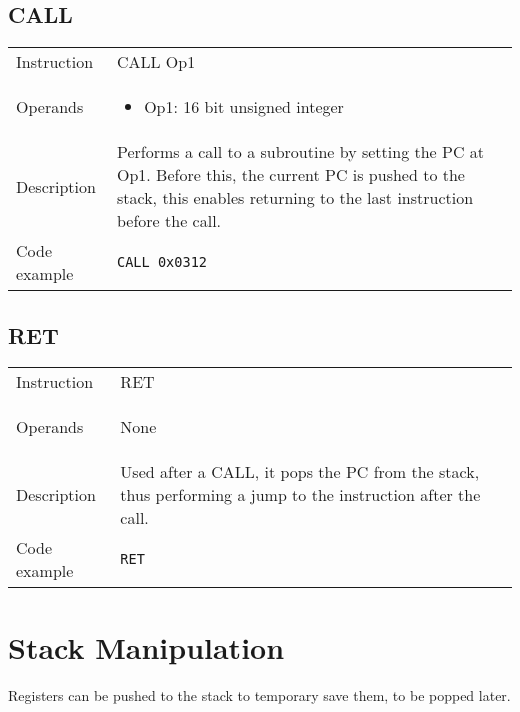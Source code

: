 \subsection{CALL}
\renewcommand*{\arraystretch}{2.0}
\begin{longtable}{P{3cm}P{9cm}}
\midrule
\noindent Instruction & CALL Op1 \\
\noindent Operands &
\begin{itemize}[label={},noitemsep,leftmargin=*,topsep=0pt,partopsep=0pt, itemsep=1em]
\item Op1: 16 bit unsigned integer
\end{itemize}\\
\noindent Description & Performs a call to a subroutine by setting the PC at Op1. Before this, the current PC is pushed to the stack, this enables returning to the last instruction before the call. \\
\noindent Code example & 
\begin{lstlisting}
CALL 0x0312
\end{lstlisting} \\
\end{longtable}


\subsection{RET}
\renewcommand*{\arraystretch}{2.0}
\begin{longtable}{P{3cm}P{9cm}}
\midrule
\noindent Instruction & RET \\
\noindent Operands &
\begin{itemize}[label={},noitemsep,leftmargin=*,topsep=0pt,partopsep=0pt, itemsep=1em]None\end{itemize}\\
\noindent Description & Used after a CALL, it pops the PC from the stack, thus performing a jump to the instruction after the call. \\
\noindent Code example & 
\begin{lstlisting}
RET
\end{lstlisting} \\
\end{longtable}


\newpage

\section{Stack Manipulation}
Registers can be pushed to the stack to temporary save them, to be popped later.

